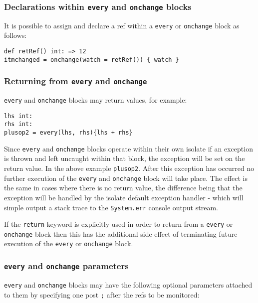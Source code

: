 \documentclass[conc-doc]{subfiles}
\begin{document}
\subsubsection{Declarations within \lstinline{every} and \lstinline{onchange} blocks}
It is possible to assign and declare a ref within a \lstinline{every} or \lstinline{onchange} block as follows:
\begin{lstlisting}
def retRef() int: => 12
itmchanged = onchange(watch = retRef()) { watch }
\end{lstlisting}	

\subsubsection{Returning from \lstinline{every} and \lstinline{onchange}}
\label{subsubsec:returnEveryonechange}
\lstinline{every} and \lstinline{onchange} blocks may return values, for example:

\begin{lstlisting}
lhs int:
rhs int:
plusop2 = every(lhs, rhs){lhs + rhs}
\end{lstlisting}	

Since \lstinline{every} and \lstinline{onchange} blocks operate within their own isolate if an exception is thrown and left uncaught within that block, the exception will be set on the return value. In the above example \lstinline{plusop2}. After this exception has occurred no further execution of the \lstinline{every} and \lstinline{onchange} block will take place. The effect is the same in cases where there is no return value, the difference being that the exception will be handled by the isolate default exception handler - which will simple output a stack trace to the \lstinline{System.err} console output stream.

If the \lstinline{return} keyword is explicitly used in order to return from a \lstinline{every} or \lstinline{onchange} block then this has the additional side effect of terminating future execution of the \lstinline{every} or \lstinline{onchange} block.

\subsubsection{\lstinline{every} and \lstinline{onchange} parameters}
\lstinline{every} and \lstinline{onchange} blocks may have the following optional parameters attached to them by specifying one post \lstinline{;} after the refs to be monitored:
\end{document}
